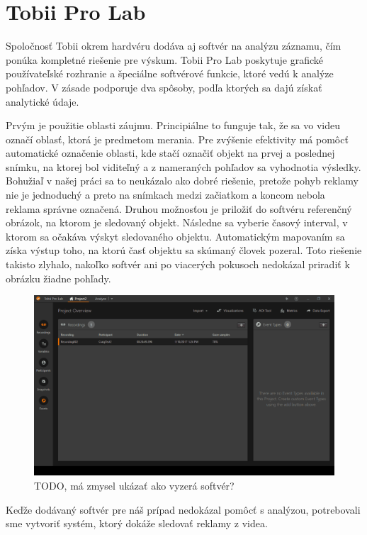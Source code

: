 \section{Tobii Pro Lab}

Spoločnosť Tobii okrem hardvéru dodáva aj softvér na analýzu záznamu, čím ponúka kompletné riešenie pre výskum. Tobii Pro Lab poskytuje grafické používateľské rozhranie a špeciálne softvérové funkcie, ktoré vedú k analýze pohľadov. V zásade podporuje dva spôsoby, podľa ktorých sa dajú získať analytické údaje. 

Prvým je použitie oblasti záujmu. Principiálne to funguje tak, že sa vo videu označí oblasť, ktorá je predmetom merania. Pre zvýšenie efektivity má pomôcť automatické označenie oblasti, kde stačí označiť objekt na prvej a poslednej snímku, na ktorej bol viditeľný a z nameraných pohľadov sa vyhodnotia výsledky. Bohužiaľ v našej práci sa to neukázalo ako dobré riešenie, pretože pohyb reklamy nie je jednoduchý a preto na snímkach medzi začiatkom a koncom nebola reklama správne označená. Druhou možnosťou je priložiť do softvéru referenčný obrázok, na ktorom je sledovaný objekt. Následne sa vyberie časový interval, v ktorom sa očakáva výskyt sledovaného objektu. Automatickým mapovaním sa získa výstup toho, na ktorú časť objektu sa skúmaný človek pozeral. Toto riešenie takisto zlyhalo, nakoľko softvér ani po viacerých pokusoch nedokázal priradiť k obrázku žiadne pohľady.
\\
\begin{figure}[ht]
    \centering
    \includegraphics[width=1\textwidth]{images/02/prolab.png}
    \caption{TODO, má zmysel ukázať ako vyzerá softvér?}
    \label{img:lab}
\end{figure}

Keďže dodávaný softvér pre náš prípad nedokázal pomôcť s analýzou, potrebovali sme vytvoriť systém, ktorý dokáže sledovať reklamy z videa. %

